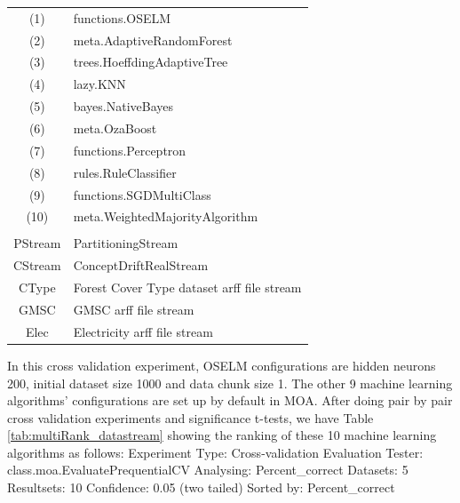 \documentclass[a4paper, 14pt]{extarticle}
\begin{document}
\begin{landscape}
\begin{table}[thb]
\scriptsize
{\centering
\begin{tabular}{cl}\\
(1) & functions.OSELM \\
(2) & meta.AdaptiveRandomForest  \\
(3) & trees.HoeffdingAdaptiveTree \\
(4) & lazy.KNN \\
(5) & bayes.NativeBayes \\
(6) & meta.OzaBoost \\
(7) & functions.Perceptron \\
(8) & rules.RuleClassifier \\
(9) & functions.SGDMultiClass \\
(10) & meta.WeightedMajorityAlgorithm\\
\\
PStream & PartitioningStream\\
CStream & ConceptDriftRealStream\\
CType & Forest Cover Type dataset arff file stream \\
GMSC & GMSC arff file stream\\
Elec & Electricity arff file stream\\
\end{tabular}
}
\end{table}

\end{landscape}
In this cross validation experiment, OSELM configurations are hidden neurons 200, initial dataset size 1000 and data chunk size 1. The other 9 machine learning algorithms' configurations are set up by default in MOA. After doing pair by pair cross validation experiments and significance t-tests, we have Table \ref{tab:multiRank_datastream} showing the ranking of these 10 machine learning algorithms  as follows:
\newline\newline
Experiment Type: Cross-validation \newline
Evaluation Tester: class.moa.EvaluatePrequentialCV     \newline
Analysing:  Percent\_correct \newline
Datasets:   5 \newline
Resultsets: 10 \newline
Confidence: 0.05 (two tailed) \newline
Sorted by:  Percent\_correct
\end{document}
